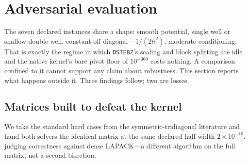 \documentclass[twocolumn,10pt,a4paper]{article}
\theoremstyle{plain}
\theoremstyle{definition}
\begin{document}
\section{Adversarial evaluation}
\label{sec:adversarial}

The seven declared instances share a shape: smooth potential, single well or
shallow double well, constant off-diagonal $-1/(2h^{2})$, moderate conditioning.
That is exactly the regime in which \texttt{DSTEBZ}'s scaling and block
splitting \citep{demmel1995} are idle and the native kernel's bare pivot floor
of $10^{-300}$ costs nothing. A comparison confined to it cannot support any
claim about robustness. This section reports what happens outside it. Three
findings follow; two are losses.

\subsection{Matrices built to defeat the kernel}
\label{sec:advmatrix}

We take the standard hard cases from the symmetric-tridiagonal literature and
hand both solvers the identical matrix at the same declared half-width
$2\times10^{-10}$, judging correctness against dense LAPACK---a different
algorithm on the full matrix, not a second bisection.
\end{document}
